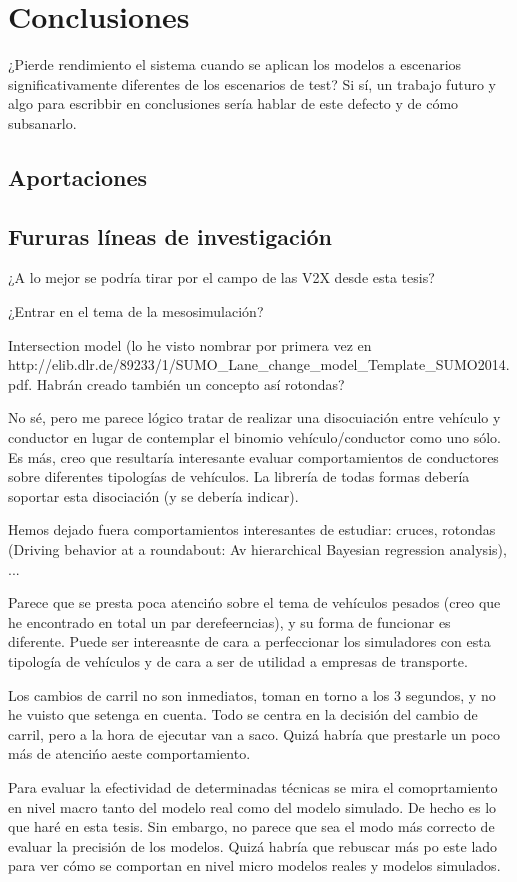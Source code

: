 \chapter{Conclusiones}
\label{ch:conclusions}

¿Pierde rendimiento el sistema cuando se aplican los modelos a escenarios significativamente diferentes de los escenarios de test? Si sí, un trabajo futuro y algo para escribbir en conclusiones sería hablar de este defecto y de cómo subsanarlo.

\section{Aportaciones}
\label{ch:conclusions:contributions}

\section{Fururas líneas de investigación}
\label{ch:conclusions:future-work}

¿A lo mejor se podría tirar por el campo de las V2X desde esta tesis?

¿Entrar en el tema de la mesosimulación?

Intersection model (lo he visto nombrar por primera vez en http://elib.dlr.de/89233/1/SUMO\_Lane\_change\_model\_Template\_SUMO2014.pdf. Habrán creado también un concepto así rotondas?

No sé, pero me parece lógico tratar de realizar una disocuiación entre vehículo y conductor en lugar de contemplar el binomio vehículo/conductor como uno sólo. Es más, creo que resultaría interesante evaluar comportamientos de conductores sobre diferentes tipologías de vehículos. La librería de todas formas debería soportar esta disociación (y se debería indicar).

Hemos dejado fuera comportamientos interesantes de estudiar: cruces, rotondas (Driving behavior at a roundabout: Av hierarchical Bayesian regression analysis), ...

Parece que se presta poca atencińo sobre el tema de vehículos pesados (creo que he encontrado en total un par derefeerncias), y su forma de funcionar es diferente. Puede ser intereasnte de cara a perfeccionar los simuladores con esta tipología de vehículos y de cara a ser de utilidad a empresas de transporte.

Los cambios de carril no son inmediatos, toman en torno a los 3 segundos, y no he vuisto que setenga en cuenta. Todo se centra en la decisión del cambio de carril, pero a la hora de ejecutar van a saco. Quizá habría que prestarle un poco más de atencińo aeste comportamiento.

Para evaluar la efectividad de determinadas técnicas se mira el comoprtamiento en nivel macro tanto del modelo real como del modelo simulado. De hecho es lo que haré en esta tesis. Sin embargo, no parece que sea el modo más correcto de evaluar la precisión de los modelos. Quizá habría que rebuscar más po este lado para ver cómo se comportan en nivel micro modelos reales y modelos simulados.